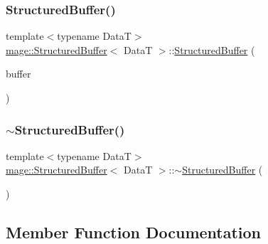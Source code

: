 \subsubsection{\texorpdfstring{Structured\+Buffer()}{StructuredBuffer()}\hspace{0.1cm}{\footnotesize\ttfamily [3/3]}}
{\footnotesize\ttfamily template$<$typename DataT$>$ \\
\hyperlink{structmage_1_1_structured_buffer}{mage\+::\+Structured\+Buffer}$<$ DataT $>$\+::\hyperlink{structmage_1_1_structured_buffer}{Structured\+Buffer} (\begin{DoxyParamCaption}\item[{\hyperlink{structmage_1_1_structured_buffer}{Structured\+Buffer}$<$ DataT $>$ \&\&}]{buffer }\end{DoxyParamCaption})\hspace{0.3cm}{\ttfamily [default]}}

\hypertarget{structmage_1_1_structured_buffer_a02ab1d322e1aef0c608b85224b80dbcf}{}\label{structmage_1_1_structured_buffer_a02ab1d322e1aef0c608b85224b80dbcf} 
\subsubsection{\texorpdfstring{$\sim$\+Structured\+Buffer()}{~StructuredBuffer()}}
{\footnotesize\ttfamily template$<$typename DataT$>$ \\
\hyperlink{structmage_1_1_structured_buffer}{mage\+::\+Structured\+Buffer}$<$ DataT $>$\+::$\sim$\hyperlink{structmage_1_1_structured_buffer}{Structured\+Buffer} (\begin{DoxyParamCaption}{ }\end{DoxyParamCaption})\hspace{0.3cm}{\ttfamily [default]}}



\subsection{Member Function Documentation}
\hypertarget{structmage_1_1_structured_buffer_ab16999f1d2b6bc9eceb628907ed5a8c0}{}\label{structmage_1_1_structured_buffer_ab16999f1d2b6bc9eceb628907ed5a8c0} 
